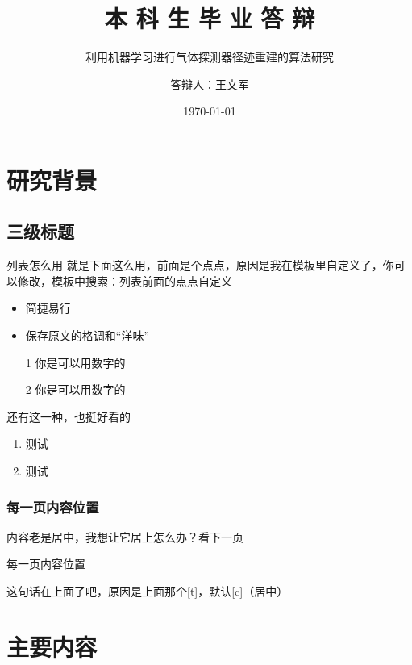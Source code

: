 \documentclass[14pt, AutoFakeBold]{ldr}
\title{本 科 生 毕 业 答 辩}
\subtitle{利用机器学习进行气体探测器径迹重建的算法研究}
\author{答辩人：王文军}
\institute{指导老师：张毅教授}
\date{\today}
\begin{document}
\maketitle


\section{研究背景}
\subsection{三级标题}


\begin{frame}[c]{列表怎么用}
就是下面这么用，前面是个点点，原因是我在模板里自定义了，你可以修改，模板中搜索：列表前面的点点自定义
  \begin{itemize}
  \item 简捷易行
  \item 保存原文的格调和“洋味”
  \item[1] 你是可以用数字的
  \item[2] 你是可以用数字的
  \end{itemize}
还有这一种，也挺好看的
  \begin{enumerate}
    \item 测试
    \item 测试
  \end{enumerate}
\end{frame}




\begin{frame}
  \frametitle{每一页内容位置}

  内容老是居中，我想让它居上怎么办？看下一页


\end{frame}

\begin{frame}[t]{每一页内容位置}

  这句话在上面了吧，原因是上面那个[t]，默认[c]（居中）


\end{frame}



\section{主要内容}
\end{document}
